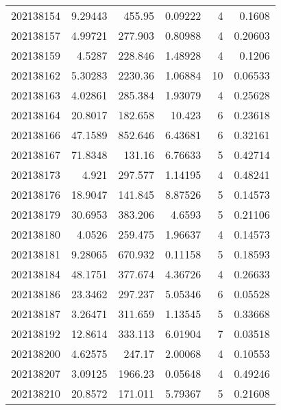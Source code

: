 \begin{tabular}{rrrrrr}
 202138154 &          9.29443 &      455.95   &            0.09222 &           4 & 0.1608  \\
 202138157 &          4.99721 &      277.903  &            0.80988 &           4 & 0.20603 \\
 202138159 &          4.5287  &      228.846  &            1.48928 &           4 & 0.1206  \\
 202138162 &          5.30283 &     2230.36   &            1.06884 &          10 & 0.06533 \\
 202138163 &          4.02861 &      285.384  &            1.93079 &           4 & 0.25628 \\
 202138164 &         20.8017  &      182.658  &           10.423   &           6 & 0.23618 \\
 202138166 &         47.1589  &      852.646  &            6.43681 &           6 & 0.32161 \\
 202138167 &         71.8348  &      131.16   &            6.76633 &           5 & 0.42714 \\
 202138173 &          4.921   &      297.577  &            1.14195 &           4 & 0.48241 \\
 202138176 &         18.9047  &      141.845  &            8.87526 &           5 & 0.14573 \\
 202138179 &         30.6953  &      383.206  &            4.6593  &           5 & 0.21106 \\
 202138180 &          4.0526  &      259.475  &            1.96637 &           4 & 0.14573 \\
 202138181 &          9.28065 &      670.932  &            0.11158 &           5 & 0.18593 \\
 202138184 &         48.1751  &      377.674  &            4.36726 &           4 & 0.26633 \\
 202138186 &         23.3462  &      297.237  &            5.05346 &           6 & 0.05528 \\
 202138187 &          3.26471 &      311.659  &            1.13545 &           5 & 0.33668 \\
 202138192 &         12.8614  &      333.113  &            6.01904 &           7 & 0.03518 \\
 202138200 &          4.62575 &      247.17   &            2.00068 &           4 & 0.10553 \\
 202138207 &          3.09125 &     1966.23   &            0.05648 &           4 & 0.49246 \\
 202138210 &         20.8572  &      171.011  &            5.79367 &           5 & 0.21608 \\

\end{tabular}
